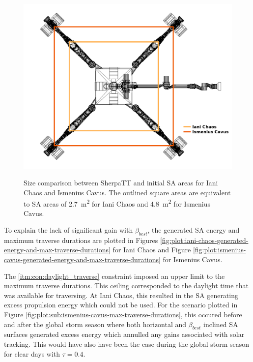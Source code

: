 \clearpage
\begin{figure}[h]
  \centering
  \hypersetup{linkcolor=captionTextColor}
  \includegraphics[width=0.8\linewidth]{sections/design/solar-array/images/sa-area-initial-sizes.png}\\
  \caption[Size comparison between SherpaTT and initial SA areas for Iani Chaos and Ismenius Cavus]
          {Size comparison between SherpaTT and initial \ac{SA} areas for Iani Chaos and Ismenius Cavus. The outlined square areas are equivalent to \ac{SA} areas of \SI{2.7}{m^{2}} for Iani Chaos and \SI{4.8}{m^{2}} for Ismenius Cavus.}
  \label{fig:sa-area-initial-sizes}
\end{figure}

To explain the lack of significant gain with $\beta_{best}$, the generated \ac{SA} energy and maximum traverse durations are plotted in Figures \ref{fig:plot:iani-chaos-generated-energy-and-max-traverse-durations} for Iani Chaos and Figure \ref{fig:plot:ismenius-cavus-generated-energy-and-max-traverse-durations} for Ismenius Cavus.

The \ref{itm:con:daylight_traverse} constraint imposed an upper limit to the maximum traverse durations. This ceiling corresponded to the daylight time that was available for traversing. At Iani Chaos, this resulted in the \ac{SA} generating excess propulsion energy which could not be used. For the scenario plotted in Figure \ref{fig:plot:sub:ismenius-cavus-max-traverse-durations}, this occured before and after the global storm season where both horizontal and $\beta_{best}$ inclined \ac{SA} surfaces generated excess energy which annulled any gains associated with solar tracking. This would have also have been the case during the global storm season for clear days with $\tau = 0.4$.

